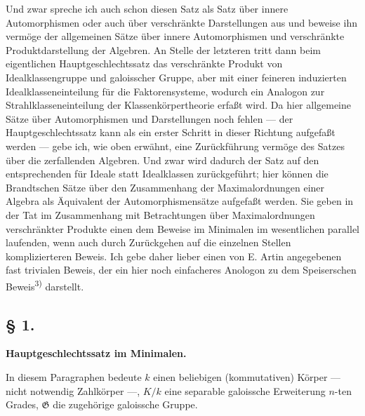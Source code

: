 Und zwar spreche ich auch schon diesen Satz als Satz über innere Automorphismen oder auch über verschränkte Darstellungen aus und beweise ihn vermöge der allgemeinen Sätze über innere Automorphismen und verschränkte Produktdarstellung der Algebren. An Stelle der letzteren tritt dann beim eigentlichen Hauptgeschlechtssatz das verschränkte Produkt von Idealklassengruppe und galoisscher Gruppe, aber mit einer feineren induzierten Idealklasseneinteilung für die Faktorensysteme, wodurch ein Analogon zur Strahlklasseneinteilung der Klassenkörpertheorie erfaßt wird. Da hier allgemeine Sätze über Automorphismen und Darstellungen noch fehlen --- der Hauptgeschlechtssatz kann als ein erster Schritt in dieser Richtung aufgefaßt werden --- gebe ich, wie oben erwähnt, eine Zurückführung vermöge des Satzes über die zerfallenden Algebren. Und zwar wird dadurch der Satz auf den entsprechenden für Ideale statt Idealklassen zurückgeführt; hier können die Brandtschen Sätze über den Zusammenhang der Maximalordnungen einer Algebra als Äquivalent der Automorphismensätze aufgefaßt werden. Sie geben in der Tat im Zusammenhang mit Betrachtungen über Maximalordnungen verschränkter Produkte einen dem Beweise im Minimalen im wesentlichen parallel laufenden, wenn auch durch Zurückgehen auf die einzelnen Stellen komplizierteren Beweis. Ich gebe daher lieber einen von E. Artin angegebenen fast trivialen Beweis, der ein hier noch einfacheres Anologon zu dem Speiserschen Beweis\textsuperscript{3)} darstellt.

\subsection*{§ 1.}
\begin{center}
\textbf{Hauptgeschlechtssatz im Minimalen.}
\end{center}

In diesem Paragraphen bedeute \(k\) einen beliebigen (kommutativen) Körper --- nicht notwendig Zahlkörper ---, \(K/k\) eine separable galoissche Erweiterung \(n\)-ten Grades, \(\mathfrak G\) die zugehörige galoissche Gruppe.

